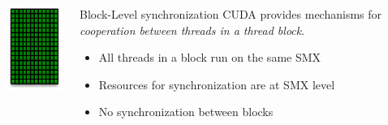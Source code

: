\begin{frame}[fragile]{}
    \begin{columns}[T]
        \begin{column}{0.3\textwidth}
            \includegraphics[width=\textwidth]{./images/smx.pdf}
        \end{column}

        \begin{column}{0.7\textwidth}
            \begin{info}{Block-Level synchronization}
            CUDA provides mechanisms for \emph{cooperation between threads in a thread block}.
            \begin{itemize}
                \item All threads in a block run on the same SMX
                \item Resources for synchronization are at SMX level
                \item No synchronization between blocks
            \end{itemize}
            \end{info}
        \end{column}
    \end{columns}

\end{frame}


